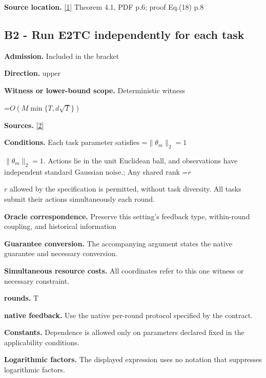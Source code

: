 \documentclass[10pt,a4paper]{article}
\newcommand{\AtlasMath}[1]{\par\begingroup\centering\setbox0=\hbox{$\displaystyle #1$}\ifdim\wd0>1.4\linewidth\typeout{ATLAS WIDE FORMULA: \the\wd0}\fi\ifdim\wd0>\linewidth\resizebox{\linewidth}{!}{\box0}\else\box0\fi\par\endgroup}
\newcommand{\AtlasInlineMath}[1]{\begingroup\setbox0=\hbox{$#1$}\ifdim\wd0>.4\linewidth\endgroup\AtlasMath{#1}\else\endgroup$#1$\fi}
\begin{document}
\textbf{Source location.} \href{https://arxiv.org/pdf/2203.15664}{[1]} Theorem 4.1, PDF p.6; proof Eq.(18) p.8



\subsection{B2 - Run E2TC independently for each task}


\textbf{Admission.} Included in the bracket



\textbf{Direction.} upper



\textbf{Witness or lower-bound scope.} Deterministic witness



\AtlasMath{O\!\left(M\min\{T,d\sqrt T\}\right)}


\textbf{Sources.} \href{https://proceedings.mlr.press/v291/zhang25b.html}{[2]}



\textbf{Conditions.} Each task parameter satisfies \AtlasInlineMath{\|\theta_m\|_2=1}. Actions lie in the unit Euclidean ball, and observations have independent standard Gaussian noise.; Any shared rank \AtlasInlineMath{r} allowed by the specification is permitted, without task diversity. All tasks submit their actions simultaneously each round.



\textbf{Oracle correspondence.} Preserve this setting's feedback type, within-round coupling, and historical information



\textbf{Guarantee conversion.} The accompanying argument states the native guarantee and necessary conversion.



\textbf{Simultaneous resource costs.} All coordinates refer to this one witness or necessary constraint.



\textbf{rounds.} T



\textbf{native feedback.} Use the native per-round protocol specified by the contract.



\textbf{Constants.} Dependence is allowed only on parameters declared fixed in the applicability conditions.



\textbf{Logarithmic factors.} The displayed expression uses no notation that suppresses logarithmic factors.
\end{document}
